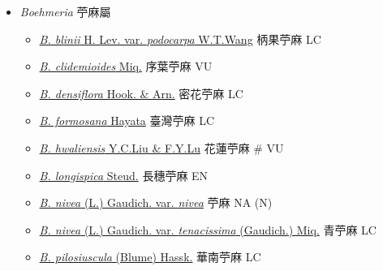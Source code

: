 
  \begin{itemize}
 \item[] \textit{Boehmeria} 苧麻屬
                                
  \begin{itemize}
        \item[] \href{http://www.theplantlist.org/tpl1.1/search?q=Boehmeria+blinii+var.+podocarpa}{\textit{B. blinii} H. Lev. var. \textit{podocarpa} W.T.Wang}   柄果苧麻   LC
        \item[] \href{http://www.theplantlist.org/tpl1.1/search?q=Boehmeria+clidemioides}{\textit{B. clidemioides} Miq.}   序葉苧麻   VU
        \item[] \href{http://www.theplantlist.org/tpl1.1/search?q=Boehmeria+densiflora}{\textit{B. densiflora} Hook. \& Arn.}   密花苧麻   LC
        \item[] \href{http://www.theplantlist.org/tpl1.1/search?q=Boehmeria+formosana}{\textit{B. formosana} Hayata}   臺灣苧麻   LC
        \item[] \href{http://www.theplantlist.org/tpl1.1/search?q=Boehmeria+hwaliensis}{\textit{B. hwaliensis} Y.C.Liu \& F.Y.Lu}   花蓮苧麻  \# VU
        \item[] \href{http://www.theplantlist.org/tpl1.1/search?q=Boehmeria+longispica}{\textit{B. longispica} Steud.}   長穗苧麻   EN
        \item[] \href{http://www.theplantlist.org/tpl1.1/search?q=Boehmeria+nivea+var.+nivea}{\textit{B. nivea} (L.) Gaudich. var. \textit{nivea}}   苧麻   NA (N)
        \item[] \href{http://www.theplantlist.org/tpl1.1/search?q=Boehmeria+nivea+var.+tenacissima}{\textit{B. nivea} (L.) Gaudich. var. \textit{tenacissima} (Gaudich.) Miq.}   青苧麻   LC
        \item[] \href{http://www.theplantlist.org/tpl1.1/search?q=Boehmeria+pilosiuscula}{\textit{B. pilosiuscula} (Blume) Hassk.}   華南苧麻   LC

\end{itemize}
\end{itemize}
